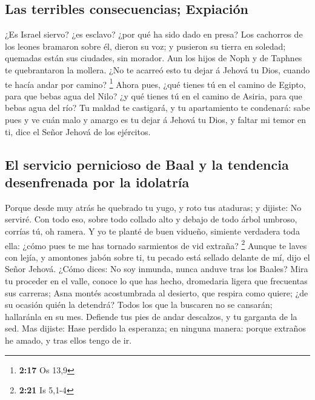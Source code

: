 \hypertarget{las-terribles-consecuencias-expiaciuxf3n}{%
\subsection{Las terribles consecuencias;
Expiación}\label{las-terribles-consecuencias-expiaciuxf3n}}

 ¿Es Israel siervo? ¿es esclavo? ¿por qué ha sido dado en
presa?  Los cachorros de los leones bramaron sobre él,
dieron su voz; y pusieron su tierra en soledad; quemadas están sus
ciudades, sin morador.  Aun los hijos de Noph y de Taphnes
te quebrantaron la mollera.  ¿No te acarreó esto tu dejar á
Jehová tu Dios, cuando te hacía andar por camino? \footnote{\textbf{2:17}
  Os 13,9}  Ahora pues, ¿qué tienes tú en el camino de
Egipto, para que bebas agua del Nilo? ¿y qué tienes tú en el camino de
Asiria, para que bebas agua del río?  Tu maldad te
castigará, y tu apartamiento te condenará: sabe pues y ve cuán malo y
amargo es tu dejar á Jehová tu Dios, y faltar mi temor en ti, dice el
Señor Jehová de los ejércitos.

\hypertarget{el-servicio-pernicioso-de-baal-y-la-tendencia-desenfrenada-por-la-idolatruxeda}{%
\subsection{El servicio pernicioso de Baal y la tendencia desenfrenada
por la
idolatría}\label{el-servicio-pernicioso-de-baal-y-la-tendencia-desenfrenada-por-la-idolatruxeda}}

 Porque desde muy atrás he quebrado tu yugo, y roto tus
ataduras; y dijiste: No serviré. Con todo eso, sobre todo collado alto y
debajo de todo árbol umbroso, corrías tú, oh ramera.  Y yo
te planté de buen vidueño, simiente verdadera toda ella: ¿cómo pues te
me has tornado sarmientos de vid extraña? \footnote{\textbf{2:21} Is
  5,1-4}  Aunque te laves con lejía, y amontones jabón
sobre ti, tu pecado está sellado delante de mí, dijo el Señor Jehová.
 ¿Cómo dices: No soy inmunda, nunca anduve tras los Baales?
Mira tu proceder en el valle, conoce lo que has hecho, dromedaria ligera
que frecuentas sus carreras;  Asna montés acostumbrada al
desierto, que respira como quiere; ¿de su ocasión quién la detendrá?
Todos los que la buscaren no se cansarán; hallaránla en su mes.
 Defiende tus pies de andar descalzos, y tu garganta de la
sed. Mas dijiste: Hase perdido la esperanza; en ninguna manera: porque
extraños he amado, y tras ellos tengo de ir.

